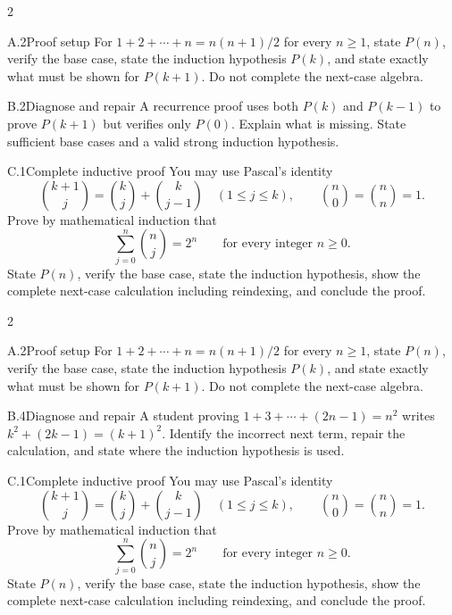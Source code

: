 \documentclass[9pt]{extarticle}
\begin{document}
\CoreWorkArea
\FormBreak
{}
\begin{multicols}{2}
\begin{CompactCoreProblem}{A.2}{Proof setup}
For $1+2+\cdots+n=n(n+1)/2$ for every $n\ge1$, state $P(n)$, verify the base case, state the induction hypothesis $P(k)$, and state exactly what must be shown for $P(k+1)$. Do not complete the next-case algebra.
\end{CompactCoreProblem}
\begin{CompactCoreProblem}{B.2}{Diagnose and repair}
A recurrence proof uses both $P(k)$ and $P(k-1)$ to prove $P(k+1)$ but verifies only $P(0)$. Explain what is missing. State sufficient base cases and a valid strong induction hypothesis.
\end{CompactCoreProblem}
\end{multicols}
\begin{CompactCoreProblem}{C.1}{Complete inductive proof}
You may use Pascal's identity
\[
\binom{k+1}{j}=\binom{k}{j}+\binom{k}{j-1}
\quad(1\le j\le k),\qquad
\binom{n}{0}=\binom{n}{n}=1.
\]
Prove by mathematical induction that
\[
\sum_{j=0}^{n}\binom{n}{j}=2^n\qquad\text{for every integer }n\ge0.
\]
State $P(n)$, verify the base case, state the induction hypothesis, show the complete next-case calculation including reindexing, and conclude the proof.
\end{CompactCoreProblem}
\CoreWorkArea
\FormBreak
{}
\begin{multicols}{2}
\begin{CompactCoreProblem}{A.2}{Proof setup}
For $1+2+\cdots+n=n(n+1)/2$ for every $n\ge1$, state $P(n)$, verify the base case, state the induction hypothesis $P(k)$, and state exactly what must be shown for $P(k+1)$. Do not complete the next-case algebra.
\end{CompactCoreProblem}
\begin{CompactCoreProblem}{B.4}{Diagnose and repair}
A student proving $1+3+\cdots+(2n-1)=n^2$ writes $k^2+(2k-1)=(k+1)^2$. Identify the incorrect next term, repair the calculation, and state where the induction hypothesis is used.
\end{CompactCoreProblem}
\end{multicols}
\begin{CompactCoreProblem}{C.1}{Complete inductive proof}
You may use Pascal's identity
\[
\binom{k+1}{j}=\binom{k}{j}+\binom{k}{j-1}
\quad(1\le j\le k),\qquad
\binom{n}{0}=\binom{n}{n}=1.
\]
Prove by mathematical induction that
\[
\sum_{j=0}^{n}\binom{n}{j}=2^n\qquad\text{for every integer }n\ge0.
\]
State $P(n)$, verify the base case, state the induction hypothesis, show the complete next-case calculation including reindexing, and conclude the proof.
\end{CompactCoreProblem}
\end{document}
